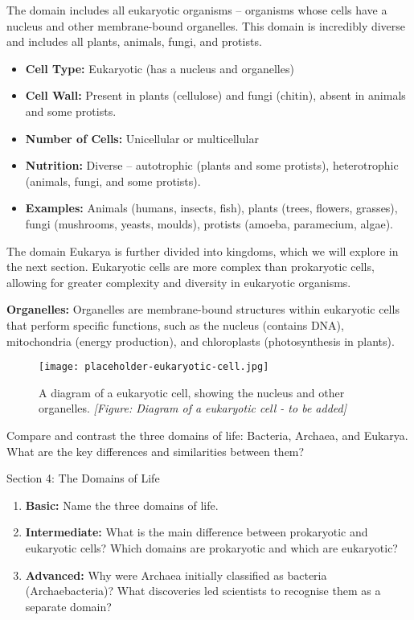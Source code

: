 The domain  includes all eukaryotic organisms – organisms whose cells have a nucleus and other membrane-bound organelles.  This domain is incredibly diverse and includes all plants, animals, fungi, and protists.

\begin{itemize}
    \item \textbf{Cell Type:} Eukaryotic (has a nucleus and organelles)
    \item \textbf{Cell Wall:} Present in plants (cellulose) and fungi (chitin), absent in animals and some protists.
    \item \textbf{Number of Cells:} Unicellular or multicellular
    \item \textbf{Nutrition:} Diverse – autotrophic (plants and some protists), heterotrophic (animals, fungi, and some protists).
    \item \textbf{Examples:} Animals (humans, insects, fish), plants (trees, flowers, grasses), fungi (mushrooms, yeasts, moulds), protists (amoeba, paramecium, algae).
\end{itemize}

The domain Eukarya is further divided into kingdoms, which we will explore in the next section.  Eukaryotic cells are more complex than prokaryotic cells, allowing for greater complexity and diversity in eukaryotic organisms.

\begin{marginnote}
\textbf{Organelles:} Organelles are membrane-bound structures within eukaryotic cells that perform specific functions, such as the nucleus (contains DNA), mitochondria (energy production), and chloroplasts (photosynthesis in plants).
\end{marginnote}

\begin{figure}
\centering
\texttt{[image: placeholder-eukaryotic-cell.jpg]}
\caption{A diagram of a eukaryotic cell, showing the nucleus and other organelles. \textit{[Figure: Diagram of a eukaryotic cell - to be added]}}
\end{figure}


\begin{stopandthink}
Compare and contrast the three domains of life: Bacteria, Archaea, and Eukarya. What are the key differences and similarities between them?
\end{stopandthink}


\begin{tieredquestions}{Section 4: The Domains of Life}
\begin{enumerate}
    \item \textbf{Basic:} Name the three domains of life.
    \item \textbf{Intermediate:} What is the main difference between prokaryotic and eukaryotic cells? Which domains are prokaryotic and which are eukaryotic?
    \item \textbf{Advanced:}  Why were Archaea initially classified as bacteria (Archaebacteria)? What discoveries led scientists to recognise them as a separate domain?
\end{enumerate}
\end{tieredquestions}


